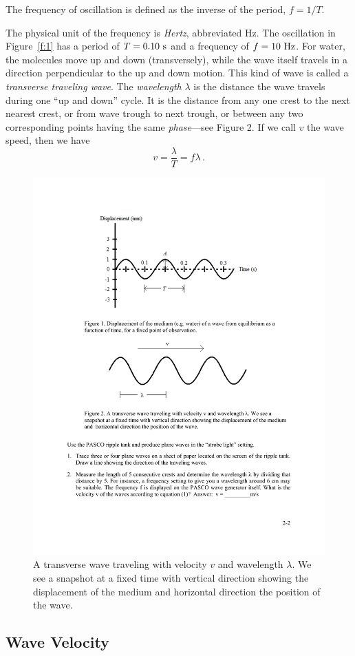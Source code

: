 \documentclass[11pt]{NSF}
\def\be{\begin{equation}}
\def\ee{\end{equation}}
\begin{document}
The frequency of oscillation is defined as the inverse of the period,
$f=1/T$.

The physical unit of the frequency is {\em Hertz}, abbreviated Hz. 
The oscillation in Figure~\ref{f:1} 
has a period of $T = 0.10~{\rm s}$ and a frequency of $f = 10~{\rm Hz}$. 
For water, the molecules move up and down (transversely), while the wave 
itself travels in a direction perpendicular to the up and down motion. 
This kind of wave is called a {\em transverse traveling wave}. 
The {\em wavelength} $\lambda$ is the distance the wave travels 
during one ``up and down” cycle. 
It is the distance from any one crest
to the next nearest crest, or from wave trough to next trough, or between any
two corresponding points having the same {\em phase}---see Figure 2. 
If we call $v$ the wave speed, then we have
\be
v = \frac{\lambda}{T} = f\lambda\,.
\ee
%
\begin{figure}[hbtp]
\begin{center}
\includegraphics[width=.6\textwidth]{fig2_2}
\caption{A transverse wave traveling with velocity $v$ and wavelength 
$\lambda$. 
We see a snapshot at a fixed time with vertical direction 
showing the displacement of
the medium and horizontal direction the position of the wave.}
\label{f:2}
\end{center}
\end{figure}
%

\subsection{Wave Velocity}
\end{document}
